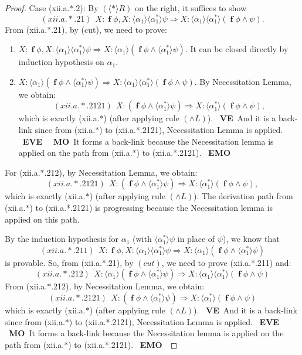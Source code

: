 \documentclass[manuscript,screen]{acmart}
\newcommand{\la}[0]{\langle}
\newcommand{\ra}[0]{\rangle}
\newcommand{\lup}[0]{*}
\DeclareMathOperator{\ofst}{\mathbf{f}}
\newcommand{\A}[1]{\mbox{ \textbf{#1} }}
\newcommand{\MO}{\A{MO}}
\newcommand{\EMO}{\A{EMO}}
\newcommand{\VE}{\A{VE}}
\newcommand{\EVE}{\A{EVE}}
\begin{document}
\begin{proof}
Case (xii.a.$*$.2): 
By $(\la\lup\ra R)$ on the right, it suffices to show 
$$(xii.a.*.21)\ \ X : \ofst\phi, X : \la\alpha_1\ra\la\alpha^*_1\ra\psi\Rightarrow X : \la\alpha_1\ra\la\alpha_1^*\ra(\ofst\phi\wedge\psi). $$
From (xii.a.$*$.21), by (cut), we need to prove:
\begin{enumerate}
\item[(xii.a.$*$.211)] $X : \ofst\phi, X : \la\alpha_1\ra\la\alpha_1^*\ra\psi\Rightarrow X : \la\alpha_1\ra(\ofst\phi\wedge\la\alpha_1^*\ra\psi)$.
It can be closed directly by induction hypothesis on $\alpha_1$. 
\item[(xii.a.$*$.212)]  $X : \la\alpha_1\ra(\ofst\phi\wedge\la\alpha_1^*\ra\psi)\Rightarrow X : \la\alpha_1\ra\la\alpha_1^*\ra(\ofst\phi\wedge\psi)$. 
\ifLuaTeX
By Necessitation Lemma, we obtain:
$$
(xii.a.*.2121)\ \ X : (\ofst\phi\wedge\la\alpha_1^*\ra\psi)\Rightarrow X : \la\alpha_1^*\ra(\ofst\phi\wedge\psi),
$$
which is exactly (xii.a.$*$) (after applying rule $(\wedge L)$).
\VE And it is a back-link since from (xii.a.$*$) to (xii.a.*.2121), Necessitation Lemma is applied. \EVE
\MO It forms a back-link because the Necessitation lemma is applied on the path from (xii.a.$*$) to (xii.a.*.2121). \EMO
\fi
\end{enumerate}

For (xii.a.$*$.212), by Necessitation Lemma, we obtain:
$$
(xii.a.*.2121)\ \ X : (\ofst\phi\wedge\la\alpha_1^*\ra\psi)\Rightarrow X : \la\alpha_1^*\ra(\ofst\phi\wedge\psi),
$$
which is exactly (xii.a.$*$) (after applying rule $(\wedge L)$).
The derivation path from (xii.a.$*$) to (xii.a.*.2121) is progressing because the Necessitation lemma is applied on this path. 

\ifx
By the induction hypothesis for $\alpha_1$ (with $\la\alpha_1^*\ra\psi$ in place of $\psi$), we know that
$$
(xii.a.*.211) \ \ X : \ofst\phi, X : \la\alpha_1\ra\la\alpha_1^*\ra\psi\Rightarrow X : \la\alpha_1\ra(\ofst\phi\wedge\la\alpha_1^*\ra\psi)
$$ is provable. 
So, from (xii.a.$*$.21), by $(cut)$, 
we need to prove (xii.a.*.211) and:
$$
(xii.a.*.212)\ \ X : \la\alpha_1\ra(\ofst\phi\wedge\la\alpha_1^*\ra\psi)\Rightarrow X : \la\alpha_1\ra\la\alpha_1^*\ra(\ofst\phi\wedge\psi)
$$
From (xii.a.$*$.212), by Necessitation Lemma, we obtain:
$$
(xii.a.*.2121)\ \ X : (\ofst\phi\wedge\la\alpha_1^*\ra\psi)\Rightarrow X : \la\alpha_1^*\ra(\ofst\phi\wedge\psi)
$$
which is exactly (xii.a.$*$) (after applying rule $(\wedge L)$).
\VE And it is a back-link since from (xii.a.$*$) to (xii.a.*.2121), Necessitation Lemma is applied. \EVE
\MO It forms a back-link because the Necessitation lemma is applied on the path from (xii.a.$*$) to (xii.a.*.2121). \EMO
\fi


\end{proof}
\end{document}
